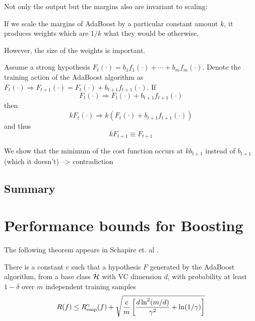 Not only the output but the margins also are invariant to scaling:

\begin{theorem}
If we scale the margins of AdaBoost by a particular constant amount
$k$, it produces weights which are $1/k$ what they would be otherwise.
\end{theorem}

However, the size of the weights is important.

\begin{theorem}
Assume a strong hypothesis $F_t(\cdot) = b_1 f_1(\cdot) + \cdots + b_m
f_m(\cdot)$.  Denote the training action of the AdaBoost algorithm as
$F_t(\cdot) \Rightarrow F_{t+1}(\cdot) = F_t(\cdot) +
b_{t+1}f_{t+1}(\cdot)$.  If
\[
	F_t(\cdot) \Rightarrow F_t(\cdot) + b_{t+1}f_{t+1}(\cdot)
\]
then
\[
	kF_t(\cdot) \Rightarrow k\left( F_t(\cdot) +
	b_{t+1}f_{t+1}(\cdot) \right)
\]
and thus
\[
	kF_{t+1} \equiv F_{t+1}
\]

\proof We show that the minimum of the cost function occurs at
$kb_{t+1}$ instead of $b_{t+1}$ (which it doesn't) --> contradiction
\end{theorem}


\subsection{Summary}


\section{Performance bounds for Boosting}

The following theorem appears in Schapire et. al \cite{Schapire97}.

\begin{theorem}[Performance bound for boosting ($p$=1)]

There is a constant $c$ such that a hypothesis $F$ generated by the
AdaBoost algorithm, from a base class $\mathcal{H}$ with VC dimension $d$,
with probability at least $1 - \delta$ over $m$ independent training
samples
\begin{equation}
R(f) \leq R_{\mathrm{emp}}^{\gamma}(f) + \sqrt{\frac{c}{m} \left[ \frac{d
\ln^2 (m/d)}{\gamma^2} + \ln(1/\gamma) \right] }
\end{equation}
\end{theorem}


